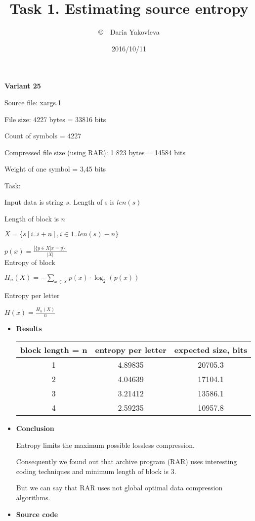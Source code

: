 \documentclass[12pt]{article}
\title{Task 1. 
Estimating source entropy}
\author{\copyright~~Daria Yakovleva}
\date{2016/10/11}
\begin{document}
\maketitle
\thispagestyle{empty}

\textbf{Variant 25}

Source file: xargs.1

File size: 4227 bytes = 33816 bits

Count of symbols = 4227

Compressed file size (using RAR): 1 823 bytes = 14584 bits

Weight of one symbol =   3,45 bits

Task:

Input data is string $s$. Length of s is $len(s)$

Length of block is $n$

$X = \{s[i..i + n], i \in 1..len(s) - n\}$

$p(x) =  \frac{|\{y \in X | x = y\}|}{|X|}$ \\


Entropy of block

$H_n(X) = \displaystyle-\sum_{x \in X} p(x) \cdot \log_{2}(p(x))$

Entropy per letter

$H(x) = \frac{H_n(X)}{n}$


\begin{itemize}	
	\item \textbf{Results}
	\begin{center}
	 	\begin{tabular}{ | c | c | c |}
			\hline
			block length = n & entropy per letter & expected size, bits \\ \hline
			1 & 4.89835 & 20705.3\\
			\hline
			2 & 4.04639 & 17104.1\\
			\hline
			3 & 3.21412 & 13586.1\\
			\hline
			4 & 2.59235 & 10957.8\\
			\hline
		\end{tabular}
	\end{center}
	\item \textbf{Conclusion}
	
		Entropy limits the maximum possible lossless compression.
		
		Consequently we found out that archive program (RAR) uses interesting coding techniques and minimum length of block is 3.
		
		But we can say that RAR uses not global optimal data compression algorithms.
		
	\item \textbf{Source code}
\end{itemize}
\end{document}
